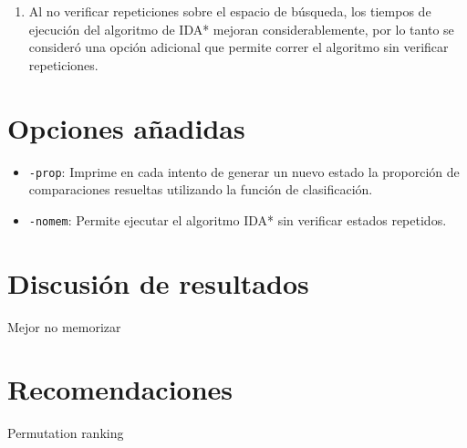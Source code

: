\documentclass[letterpaper,12pt, titlepage]{article}
\newcommand{\ms}{\texttt}
\begin{document}
\begin{enumerate}
\item Al no verificar repeticiones sobre el espacio de búsqueda,
los tiempos de ejecución del algoritmo de IDA* mejoran considerablemente,
por lo tanto se consideró una opción adicional que permite correr el
algoritmo sin verificar repeticiones.
\end{enumerate}

\section{Opciones añadidas}

\begin{itemize}
\item \ms{-prop}: Imprime en cada intento de generar un nuevo estado
la proporción de comparaciones resueltas utilizando la función de
clasificación.

\item \ms{-nomem}: Permite ejecutar el algoritmo IDA* sin verificar
estados repetidos.

\end{itemize}

\section{Discusión de resultados}
Mejor no memorizar
\section{Recomendaciones}
Permutation ranking
\end{document}

